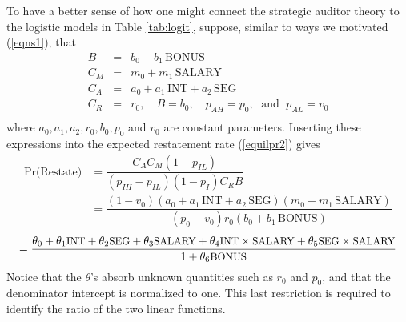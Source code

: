 To have a better sense of how one might connect the strategic auditor theory to the
logistic models in Table \ref{tab:logit}, suppose, similar to ways we motivated (\ref{eqns1}), that 
\begin{equation}\begin{array}{lcl}\label{eqns2}
B & = & b_0 + b_1 \, \mbox{BONUS} \\[.5em]
C_M & = & m_0 + m_1 \, \mbox{SALARY} \\[.5em]
C_A & = & a_0 + a_1 \, \mbox{INT} + a_2 \, \mbox{SEG}\\[.5em]
C_R & = & r_0, \quad B  =  b_0, \quad p_{AH}   =  p_0, \; \mbox{ and } \; p_{AL}  =  v_0 \\[.5em]
\end{array}
\end{equation}
where $ a_0, a_1, a_2, r_0, b_0, p_0$ and $v_0$ are constant parameters. 
Inserting these expressions into the expected restatement rate (\ref{equilpr2}) gives
\begin{align*} \label{equilpr3}
\mbox{Pr(Restate)} & =   \dfrac{C_AC_M(1-p_{IL})}{(p_{IH}-p_{IL})(1-p_I)C_RB} \\
&= \dfrac{(1-v_0)(a_0 + a_1 \, \mbox{INT} + a_2 \, \mbox{SEG})(m_0 + m_1 \, \mbox{SALARY})}
{(p_0-v_0)r_0(b_0 + b_1 \, \mbox{BONUS})}
\end{align*}
\begin{equation}\label{equilpr4}
 =  \dfrac{\theta_0 + \theta_1\mbox{\small INT} + \theta_2\mbox{\small SEG} + \theta_3\mbox{\small SALARY}
+ \theta_4\mbox{\small INT} \times \mbox{\small SALARY}+ \theta_5\mbox{\small SEG} \times \mbox{\small SALARY}}
{1 +  \theta_6\mbox{\small BONUS}}
\end{equation}
Notice that the $\theta$'s absorb unknown quantities such as $r_0$ and $p_0$, and that the denominator intercept
is normalized to one. This last restriction is required to identify the ratio of the two linear functions.

